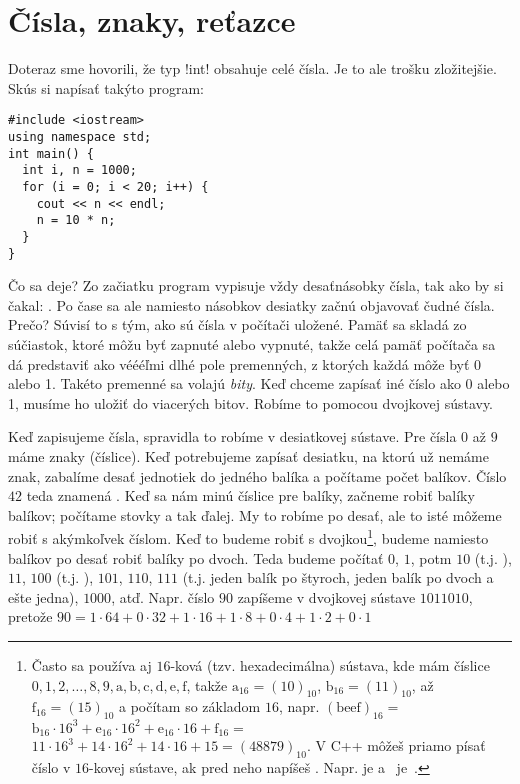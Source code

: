 \chapter{Čísla, znaky, reťazce}
\label{sect:cisla}

Doteraz sme hovorili, že typ \prg!int! obsahuje celé čísla. Je to ale trošku zložitejšie.
Skús si napísať takýto program:\\

\begin{lstlisting}
#include <iostream>
using namespace std;
int main() {
  int i, n = 1000;
  for (i = 0; i < 20; i++) {
    cout << n << endl;
    n = 10 * n;
  }
}
\end{lstlisting}


Čo sa deje? Zo začiatku program vypisuje vždy desaťnásobky čísla, tak ako by si čakal:
. Po čase sa ale namiesto násobkov desiatky začnú objavovať
čudné čísla. Prečo? Súvisí to s tým, ako sú čísla v počítači uložené. Pamäť sa skladá
zo súčiastok, ktoré môžu byť zapnuté alebo vypnuté, takže celá pamäť počítača sa dá predstaviť
ako véééľmi dlhé pole premenných, z ktorých každá môže byť 0 alebo 1. Takéto premenné
sa volajú {\em bity}. Keď chceme zapísať iné číslo ako 0 alebo 1, musíme ho uložiť
do viacerých bitov. Robíme to pomocou dvojkovej sústavy.

Keď zapisujeme čísla, spravidla to robíme v desiatkovej sústave. Pre čísla $0$ až $9$
máme znaky (číslice). Keď potrebujeme zapísať desiatku, na ktorú už nemáme znak, zabalíme
desať jednotiek do jedného balíka a počítame počet balíkov. Číslo $42$ teda znamená 
. Keď sa nám minú číslice pre balíky, začneme
robiť balíky balíkov; počítame stovky a tak ďalej. My to robíme 
po desať, ale to isté môžeme robiť s akýmkoľvek číslom. Keď to budeme robiť s dvojkou\footnote{\label{foot:hexa}%
Často sa používa aj $16$-ková (tzv. hexadecimálna) sústava, kde mám číslice $0,1,2,\ldots,8,9,\mathrm{a,b,c,d,e,f}$, 
takže  \hbox{$\mathrm a_{16}=(10)_{10}$,} \hbox{$\mathrm b_{16}=(11)_{10}$,} \hbox{až $\mathrm f_{16}=(15)_{10}$}
a počítam so základom $16$, napr. $(\mathrm{beef})_{16}=$
\hbox{$\mathrm b_{16}\cdot 16^3+\mathrm e_{16}\cdot16^2+\mathrm e_{16}\cdot16+\mathrm f_{16}=$}
$11\cdot16^3+14\cdot16^2+14\cdot16+15=(48879)_{10}$.
V C++ môžeš priamo písať číslo v $16$-kovej sústave, ak pred neho napíšeš . Napr. 
 je  a \hbox{ je }.
},
budeme namiesto balíkov po desať robiť balíky po dvoch. Teda budeme počítať $0$, $1$,
potm $10$ (t.j. ), $11$, $100$ (t.j. 
), $101$, $110$, $111$ (t.j.
jeden balík po štyroch, jeden balík po dvoch a ešte jedna), $1000$, atď.
Napr. číslo $90$ zapíšeme v dvojkovej sústave $1011010$, pretože
$90=1\cdot64+0\cdot32+1\cdot16+1\cdot8+0\cdot4+1\cdot2+0\cdot1$\\


